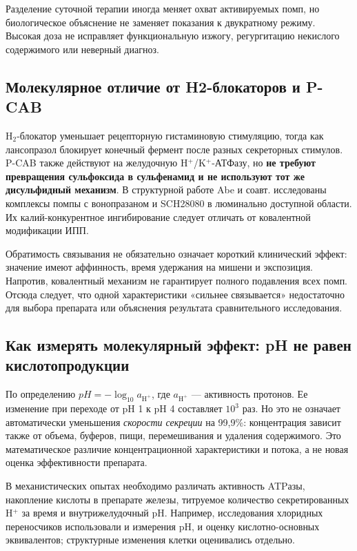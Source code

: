 \documentclass[11pt,a4paper,notitlepage]{report}
\newcommand{\src}[1]{\unskip\space\cite{#1}}
\begin{document}
Разделение суточной терапии иногда меняет охват активируемых помп, но биологическое объяснение не заменяет показания к двукратному режиму. Высокая доза не исправляет функциональную изжогу, регургитацию некислого содержимого или неверный диагноз.\src{acggerd,agagerd}

\subsection{Молекулярное отличие от H2-блокаторов и P-CAB}
H$_2$-блокатор уменьшает рецепторную гистаминовую стимуляцию, тогда как лансопразол блокирует конечный фермент после разных секреторных стимулов. P-CAB также действуют на желудочную H$^+$/K$^+$-АТФазу, но \textbf{не требуют превращения сульфоксида в сульфенамид и не используют тот же дисульфидный механизм}. В структурной работе Abe и соавт. исследованы комплексы помпы с вонопразаном и SCH28080 в люминально доступной области. Их калий-конкурентное ингибирование следует отличать от ковалентной модификации ИПП.\src{molstructure,molnagaya90}

Обратимость связывания не обязательно означает короткий клинический эффект: значение имеют аффинность, время удержания на мишени и экспозиция. Напротив, ковалентный механизм не гарантирует полного подавления всех помп. Отсюда следует, что одной характеристики «сильнее связывается» недостаточно для выбора препарата или объяснения результата сравнительного исследования.\src{agapcab,vontrial}

\subsection{Как измерять молекулярный эффект: pH не равен кислотопродукции}
По определению $pH=-\log_{10}a_{\mathrm{H}^{+}}$, где $a_{\mathrm{H}^{+}}$ --- активность протонов. Ее изменение при переходе от pH 1 к pH 4 составляет $10^3$ раз. Но это не означает автоматически уменьшения \emph{скорости секреции} на 99,9\%: концентрация зависит также от объема, буферов, пищи, перемешивания и удаления содержимого. Это математическое различие концентрационной характеристики и потока, а не новая оценка эффективности препарата.

В механистических опытах необходимо различать активность ATPазы, накопление кислоты в препарате железы, титруемое количество секретированных H$^+$ за время и внутрижелудочный pH. Например, исследования хлоридных переносчиков использовали и измерения pH, и оценку кислотно-основных эквивалентов; структурные изменения клетки оценивались отдельно.\src{molslc26,molclc2}
\end{document}
